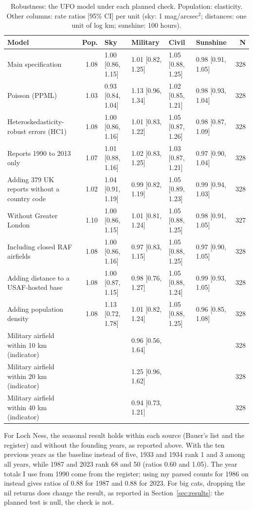 \documentclass[11pt,a4paper]{article}
\begin{document}
\begin{table}[tbp]\centering\scriptsize\caption{Robustness: the UFO model under each planned check. Population: elasticity. Other columns: rate ratios [95\% CI] per unit (sky: 1 mag/arcsec$^2$; distances: one unit of log km; sunshine: 100 hours).}\label{tab:robust}\begin{tabular}{p{4.3cm}rllllr}\toprule Model & Pop. & Sky & Military & Civil & Sunshine & N\\\midrule
Main specification & 1.08 & 1.00 [0.86, 1.15] & 1.01 [0.82, 1.25] & 1.05 [0.88, 1.25] & 0.98 [0.91, 1.05] & 328\\
Poisson (PPML) & 1.03 & 0.93 [0.84, 1.04] & 1.13 [0.96, 1.34] & 1.02 [0.85, 1.21] & 0.98 [0.93, 1.04] & 328\\
Heteroskedasticity-robust errors (HC1) & 1.08 & 1.00 [0.86, 1.16] & 1.01 [0.83, 1.22] & 1.05 [0.87, 1.26] & 0.98 [0.87, 1.09] & 328\\
Reports 1990 to 2013 only & 1.07 & 1.01 [0.88, 1.16] & 1.02 [0.83, 1.25] & 1.03 [0.87, 1.21] & 0.97 [0.90, 1.04] & 328\\
Adding 379 UK reports without a country code & 1.02 & 1.04 [0.91, 1.19] & 0.99 [0.82, 1.19] & 1.05 [0.89, 1.23] & 0.99 [0.94, 1.03] & 328\\
Without Greater London & 1.10 & 1.00 [0.86, 1.15] & 1.01 [0.81, 1.24] & 1.05 [0.88, 1.25] & 0.98 [0.91, 1.05] & 327\\
Including closed RAF airfields & 1.08 & 1.00 [0.86, 1.16] & 0.97 [0.83, 1.15] & 1.05 [0.88, 1.25] & 0.97 [0.90, 1.05] & 328\\
Adding distance to a USAF-hosted base & 1.08 & 1.00 [0.87, 1.15] & 0.98 [0.76, 1.27] & 1.05 [0.88, 1.24] & 0.99 [0.93, 1.05] & 328\\
Adding population density & 1.08 & 1.13 [0.72, 1.78] & 1.01 [0.82, 1.24] & 1.05 [0.88, 1.25] & 0.96 [0.85, 1.08] & 328\\
Military airfield within 10 km (indicator) & & & 0.96 [0.56, 1.64] & & & 328\\
Military airfield within 20 km (indicator) & & & 1.25 [0.96, 1.62] & & & 328\\
Military airfield within 40 km (indicator) & & & 0.94 [0.73, 1.21] & & & 328\\
\bottomrule\end{tabular}\end{table}

For Loch Ness, the seasonal result holds within each source (Bauer's list and the register) and without the founding years, as reported above. With the ten previous years as the baseline instead of five, 1933 and 1934 rank 1 and 3 among all years, while 1987 and 2023 rank 68 and 50 (ratios 0.60 and 1.05). The year totals I use from 1990 come from the register; using my parsed counts for 1986 on instead gives ratios of 0.88 for 1987 and 0.88 for 2023. For big cats, dropping the nil returns does change the result, as reported in Section~\ref{sec:results}: the planned test is null, the check is not.
\end{document}
